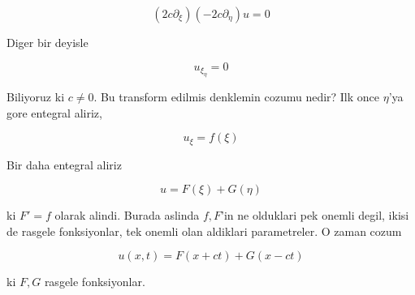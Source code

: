 \documentclass[12pt,fleqn]{article}
\begin{document}
\[ (2c\partial_\xi)(-2c\partial_\eta)u = 0 \]

Diger bir deyisle 

\[ u_{\xi_\eta} = 0 \]

Biliyoruz ki $c \ne 0$. Bu transform edilmis denklemin cozumu nedir? Ilk
once $\eta$'ya gore entegral aliriz, 

\[ u_\xi = f(\xi) \]

Bir daha entegral aliriz

\[ u = F(\xi) + G(\eta) \]

ki $F' = f$ olarak alindi. Burada aslinda $f,F$'in ne olduklari pek onemli
degil, ikisi de rasgele fonksiyonlar, tek onemli olan aldiklari
parametreler. O zaman cozum 

\[ u(x,t) = F(x+ct) + G(x-ct) \]

ki $F,G$ rasgele fonksiyonlar. 
\end{document}

